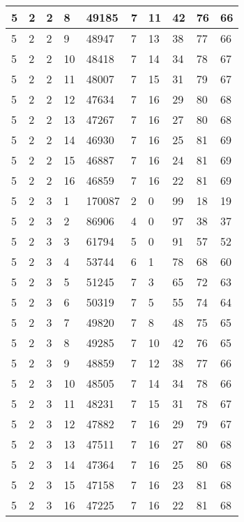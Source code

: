 \begin{table}[!ht]
\begin{tabular}{|l|l|l|l|l|l|l|l|l|l|}
        5 & 2 & 2 & 8 & 49185 & 7 & 11 & 42 & 76 & 66 \\ \hline
        5 & 2 & 2 & 9 & 48947 & 7 & 13 & 38 & 77 & 66 \\ \hline
        5 & 2 & 2 & 10 & 48418 & 7 & 14 & 34 & 78 & 67 \\ \hline
        5 & 2 & 2 & 11 & 48007 & 7 & 15 & 31 & 79 & 67 \\ \hline
        5 & 2 & 2 & 12 & 47634 & 7 & 16 & 29 & 80 & 68 \\ \hline
        5 & 2 & 2 & 13 & 47267 & 7 & 16 & 27 & 80 & 68 \\ \hline
        5 & 2 & 2 & 14 & 46930 & 7 & 16 & 25 & 81 & 69 \\ \hline
        5 & 2 & 2 & 15 & 46887 & 7 & 16 & 24 & 81 & 69 \\ \hline
        5 & 2 & 2 & 16 & 46859 & 7 & 16 & 22 & 81 & 69 \\ \hline
        5 & 2 & 3 & 1 & 170087 & 2 & 0 & 99 & 18 & 19 \\ \hline
        5 & 2 & 3 & 2 & 86906 & 4 & 0 & 97 & 38 & 37 \\ \hline
        5 & 2 & 3 & 3 & 61794 & 5 & 0 & 91 & 57 & 52 \\ \hline
        5 & 2 & 3 & 4 & 53744 & 6 & 1 & 78 & 68 & 60 \\ \hline
        5 & 2 & 3 & 5 & 51245 & 7 & 3 & 65 & 72 & 63 \\ \hline
        5 & 2 & 3 & 6 & 50319 & 7 & 5 & 55 & 74 & 64 \\ \hline
        5 & 2 & 3 & 7 & 49820 & 7 & 8 & 48 & 75 & 65 \\ \hline
        5 & 2 & 3 & 8 & 49285 & 7 & 10 & 42 & 76 & 65 \\ \hline
        5 & 2 & 3 & 9 & 48859 & 7 & 12 & 38 & 77 & 66 \\ \hline
        5 & 2 & 3 & 10 & 48505 & 7 & 14 & 34 & 78 & 66 \\ \hline
        5 & 2 & 3 & 11 & 48231 & 7 & 15 & 31 & 78 & 67 \\ \hline
        5 & 2 & 3 & 12 & 47882 & 7 & 16 & 29 & 79 & 67 \\ \hline
        5 & 2 & 3 & 13 & 47511 & 7 & 16 & 27 & 80 & 68 \\ \hline
        5 & 2 & 3 & 14 & 47364 & 7 & 16 & 25 & 80 & 68 \\ \hline
        5 & 2 & 3 & 15 & 47158 & 7 & 16 & 23 & 81 & 68 \\ \hline
        5 & 2 & 3 & 16 & 47225 & 7 & 16 & 22 & 81 & 68 \\ \hline

\end{tabular}
\end{table}
